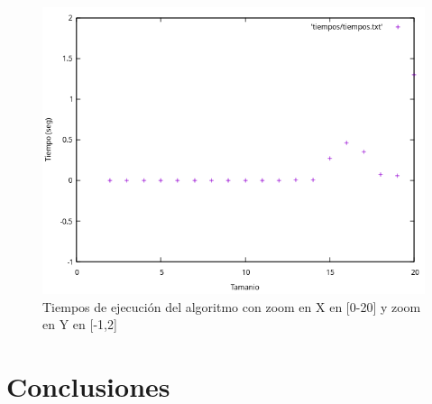 \documentclass{article}
\begin{document}
	\begin{figure}[H]
		\centering
		\includegraphics[totalheight=7cm]{grafica_intervalo_peque}
		\caption{Tiempos de ejecución del algoritmo con zoom en X en [0-20] y zoom en Y en [-1,2]}
		\label{fig:eficiencia_empirica_zoom}
	\end{figure}
	\section{Conclusiones}
	
\end{document}
